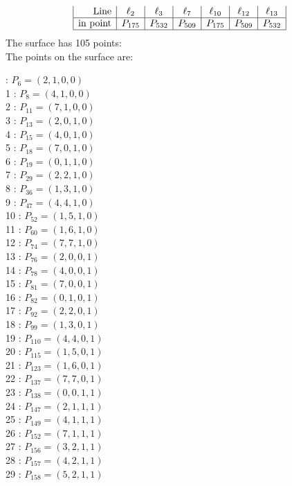 \documentclass{article}
\begin{document}
{$$\begin{array}{|r*{6}{|c}|}
\mbox{Line}  & \ell_{2} & \ell_{3} & \ell_{7} & \ell_{10} & \ell_{12} & \ell_{13}\\
\hline
\mbox{in point}  & P_{175} & P_{532} & P_{509} & P_{175} & P_{509} & P_{532}\\
\hline
\end{array}
$$
The surface has 105 points:\\
The points on the surface are:\\
\begin{multicols}{3}
 : $P_{6}=( 2, 1, 0, 0 )$\\
1 : $P_{8}=( 4, 1, 0, 0 )$\\
2 : $P_{11}=( 7, 1, 0, 0 )$\\
3 : $P_{13}=( 2, 0, 1, 0 )$\\
4 : $P_{15}=( 4, 0, 1, 0 )$\\
5 : $P_{18}=( 7, 0, 1, 0 )$\\
6 : $P_{19}=( 0, 1, 1, 0 )$\\
7 : $P_{29}=( 2, 2, 1, 0 )$\\
8 : $P_{36}=( 1, 3, 1, 0 )$\\
9 : $P_{47}=( 4, 4, 1, 0 )$\\
10 : $P_{52}=( 1, 5, 1, 0 )$\\
11 : $P_{60}=( 1, 6, 1, 0 )$\\
12 : $P_{74}=( 7, 7, 1, 0 )$\\
13 : $P_{76}=( 2, 0, 0, 1 )$\\
14 : $P_{78}=( 4, 0, 0, 1 )$\\
15 : $P_{81}=( 7, 0, 0, 1 )$\\
16 : $P_{82}=( 0, 1, 0, 1 )$\\
17 : $P_{92}=( 2, 2, 0, 1 )$\\
18 : $P_{99}=( 1, 3, 0, 1 )$\\
19 : $P_{110}=( 4, 4, 0, 1 )$\\
20 : $P_{115}=( 1, 5, 0, 1 )$\\
21 : $P_{123}=( 1, 6, 0, 1 )$\\
22 : $P_{137}=( 7, 7, 0, 1 )$\\
23 : $P_{138}=( 0, 0, 1, 1 )$\\
24 : $P_{147}=( 2, 1, 1, 1 )$\\
25 : $P_{149}=( 4, 1, 1, 1 )$\\
26 : $P_{152}=( 7, 1, 1, 1 )$\\
27 : $P_{156}=( 3, 2, 1, 1 )$\\
28 : $P_{157}=( 4, 2, 1, 1 )$\\
29 : $P_{158}=( 5, 2, 1, 1 )$\\

\end{multicols}}
\end{document}
